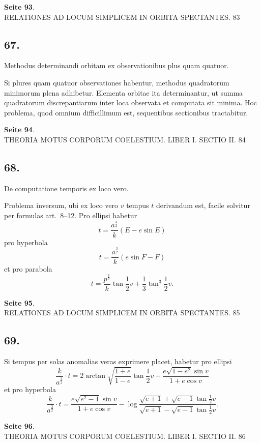 \documentclass[12pt,a4paper]{article}
\begin{document}
\textbf{Seite 93}.\\
RELATIONES AD LOCUM SIMPLICEM IN ORBITA SPECTANTES. 83

\subsection*{67.}

Methodus determinandi orbitam ex observationibus plus quam quatuor.

Si plures quam quatuor observationes habentur, methodus quadratorum minimorum plena adhibetur. Elementa orbitae ita determinantur, ut summa quadratorum discrepantiarum inter loca observata et computata sit minima. Hoc problema, quod omnium difficillimum est, sequentibus sectionibus tractabitur.

\textbf{Seite 94}.\\
THEORIA MOTUS CORPORUM COELESTIUM. LIBER I. SECTIO II. 84

\subsection*{68.}

De computatione temporis ex loco vero.

Problema inversum, ubi ex loco vero $v$ tempus $t$ derivandum est, facile solvitur per formulas art.~8--12. Pro ellipsi habetur
\[
t = \frac{a^{\frac{3}{2}}}{k} (E - e \sin E)
\]
pro hyperbola
\[
t = \frac{a^{\frac{3}{2}}}{k} (e \sin F - F)
\]
et pro parabola
\[
t = \frac{p^{\frac{3}{2}}}{k} \tan \frac{1}{2}v + \frac{1}{3} \tan^3 \frac{1}{2}v.
\]

\textbf{Seite 95}.\\
RELATIONES AD LOCUM SIMPLICEM IN ORBITA SPECTANTES. 85

\subsection*{69.}

Si tempus per solas anomalias veras exprimere placet, habetur pro ellipsi
\[
\frac{k}{a^{\frac{3}{2}}} \cdot t = 2 \arctan \sqrt{\frac{1+e}{1-e}} \tan \frac{1}{2}v - \frac{e \sqrt{1-e^2} \sin v}{1 + e \cos v}
\]
et pro hyperbola
\[
\frac{k}{a^{\frac{3}{2}}} \cdot t = \frac{e \sqrt{e^2-1} \sin v}{1 + e \cos v} - \log \frac{\sqrt{e+1} + \sqrt{e-1} \tan \frac{1}{2}v}{\sqrt{e+1} - \sqrt{e-1} \tan \frac{1}{2}v}.
\]

\textbf{Seite 96}.\\
THEORIA MOTUS CORPORUM COELESTIUM. LIBER I. SECTIO II. 86
\end{document}

